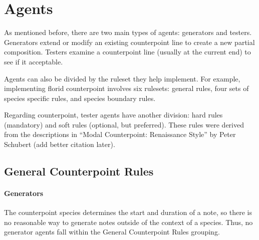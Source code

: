 \section{Agents}

As mentioned before, there are two main types of agents: generators and testers.
Generators extend or modify an existing counterpoint line to create a new partial composition.
Testers examine a counterpoint line (usually at the current end) to see if it acceptable.

%

Agents can also be divided by the ruleset they help implement.
For example, implementing florid counterpoint involves six rulesets: general rules, four sets of species specific rules, and species boundary rules.

Regarding counterpoint, tester agents have another division: hard rules (mandatory) and soft rules (optional, but preferred).
These rules were derived from the descriptions in ``Modal Counterpoint: Renaissance Style'' by Peter Schubert (add better citation later).

\subsection{General Counterpoint Rules}

\paragraph{Generators}
The counterpoint species determines the start and duration of a note, so there is no reasonable way to generate notes outside of the context of a species.
Thus, no generator agents fall within the General Counterpoint Rules grouping.

